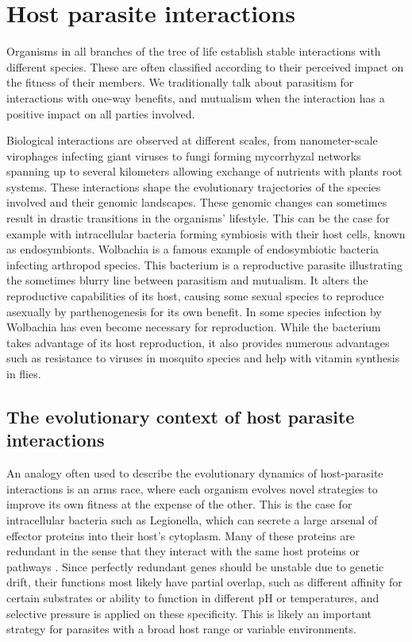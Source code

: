 
\chapter{Host parasite interactions} %

\label{ch:01-01} %


Organisms in all branches of the tree of life establish stable interactions with different species. These are often classified according to their perceived impact on the fitness of their members. We traditionally talk about parasitism for interactions with one-way benefits, and mutualism when the interaction has a positive impact on all parties involved.

Biological interactions are observed at different scales, from nanometer-scale virophages infecting giant viruses to fungi forming mycorrhyzal networks spanning up to several kilometers allowing exchange of nutrients with plants root systems. These interactions shape the evolutionary trajectories of the species involved and their genomic landscapes. These genomic changes can sometimes result in drastic transitions in the organisms' lifestyle. This can be the case for example with intracellular bacteria forming symbiosis with their host cells, known as endosymbionts. Wolbachia is a famous example of endosymbiotic bacteria infecting arthropod species. This bacterium is a reproductive parasite illustrating the sometimes blurry line between parasitism and mutualism. It alters the reproductive capabilities of its host, causing some sexual species to reproduce asexually by parthenogenesis for its own benefit. In some species infection by Wolbachia has even become necessary for reproduction. While the bacterium takes advantage of its host reproduction, it also provides numerous advantages such as resistance to viruses in mosquito species and help with vitamin synthesis in flies.


\section{The evolutionary context of host parasite interactions}

An analogy often used to describe the evolutionary dynamics of host-parasite interactions is an arms race, where each organism evolves novel strategies to improve its own fitness at the expense of the other. This is the case for intracellular bacteria such as Legionella, which can secrete a large arsenal of effector proteins into their host's cytoplasm. Many of these proteins are redundant in the sense that they interact with the same host proteins or pathways \cite{Ghosh2017}. Since perfectly redundant genes should be unstable due to genetic drift, their functions most likely have partial overlap, such as different affinity for certain substrates or ability to function in different pH or temperatures, and selective pressure is applied on these specificity. This is likely an important strategy for parasites with a broad host range or variable environments.

